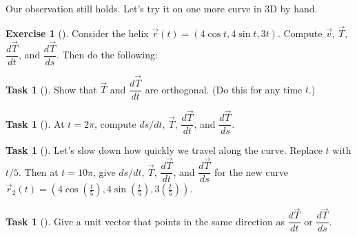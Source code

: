 \documentclass[10pt,]{book}
\theoremstyle{plain}
\theoremstyle{definition}
\theoremstyle{definition}
\theoremstyle{definition}
\theoremstyle{definition}
\newtheorem{exploration}[project]{Exercise}
\newtheorem{task}[project]{Task}
\theoremstyle{definition}
\numberwithin{equation}{section}
\begin{document}
Our observation still holds. Let's try it on one more curve in 3D by hand.%
\begin{exploration}[]\label{exploration-175}
Consider the helix \(\vec r(t)=(4\cos t,4\sin t, 3t)\). Compute \(\vec v\), \(\vec T\), \(\dfrac{d\vec T}{dt}\), and \(\dfrac{d\vec T}{ds}\). Then do the following:%
\begin{task}[]\label{task-428}
Show that \(\vec T\) and \(\dfrac{d\vec T}{dt}\) are orthogonal. (Do this for any time \(t\).)%
\end{task}
\begin{task}[]\label{task-429}
At \(t=2\pi\), compute \(ds/dt\), \(\vec T\), \(\dfrac{d\vec T}{dt}\), and \(\dfrac{d\vec T}{ds}\).%
\end{task}
\begin{task}[]\label{task-430}
Let's slow down how quickly we travel along the curve.  Replace \(t\) with \(t/5\).  Then at \(t=10\pi\), give \(ds/dt\), \(\vec T\), \(\dfrac{d\vec T}{dt}\), and \(\dfrac{d\vec T}{ds}\) for the new curve \(\vec r_2(t) =(4\cos(\frac{t}{5}),4\sin(\frac{t}{5}), 3(\frac{t}{5}))\).%
\end{task}
\begin{task}[]\label{task-431}
Give a unit vector that points in the same direction as \(\dfrac{d\vec T}{dt}\) or \(\dfrac{d\vec T}{ds}\).%
\end{task}
\end{exploration}
\typeout{************************************************}
\typeout{************************************************}
\end{document}

